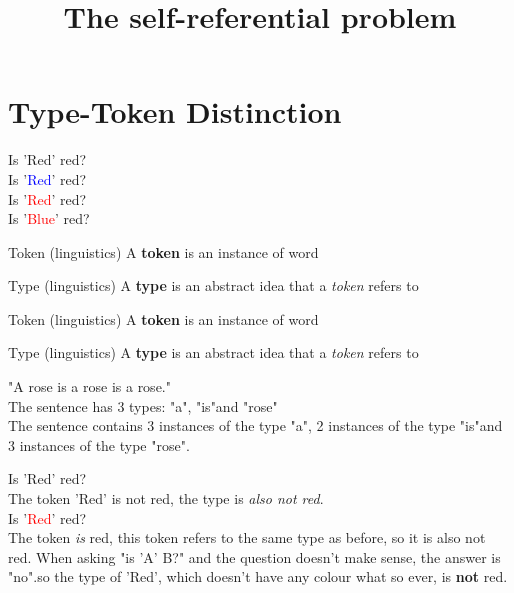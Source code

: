 

\title[self-referentialism]{The self-referential problem}

\frame{\titlepage}
\section[Type-Token]{Type-Token Distinction}
\begin{frame}
	Is 'Red' red?\pause\\
	Is '\textcolor{blue}{Red}' red?\pause\\
	Is '\textcolor{red}{Red}' red?\pause\\
	Is '\textcolor{red}{Blue}' red?\pause\\
	\begin{block}{Token (linguistics)}
		A \textbf{token} is an instance of word
	\end{block}\pause
	\begin{block}{Type (linguistics)}
		A \textbf{type} is an abstract idea that a \textit{token} refers to
	\end{block}
\end{frame}

\begin{frame}
	\begin{block}{Token (linguistics)}
		A \textbf{token} is an instance of word
	\end{block}
	\begin{block}{Type (linguistics)}
		A \textbf{type} is an abstract idea that a \textit{token} refers to
	\end{block}\pause
	"A rose is a rose is a rose."\pause\\
	The sentence has 3 types\pause: "a"\pause, "is"\pause and "rose"\pause\\
	The sentence contains 3 instances of the type "a"\pause, 2 instances of the type "is"\pause and 3 instances of the type "rose".
\end{frame}

\begin{frame}
	Is 'Red' red?\pause\\
	The token 'Red' is not red\pause, the type is \textit{also not red}.\pause\\
	Is '\textcolor{red}{Red}' red?\pause\\
	The token \textit{is} red\pause, this token refers to the same type as before, so it is also not red.\pause \newline\newline
	When asking "is 'A' B?" and the question doesn't make sense, the answer is "no".\pause so the type of 'Red', which doesn't have any colour what so ever, is \textbf{not} red.
\end{frame}

